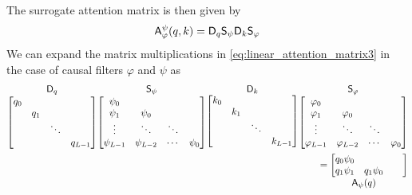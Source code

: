 %
The surrogate attention matrix is then given by
%
\begin{equation}
    \mathsf{A}_\varphi^\psi(q,k) = \mathsf{D}_q \mathsf{S}_\psi \mathsf{D}_k \mathsf{S}_\varphi
\end{equation}
%
We can expand the matrix multiplications in \eqref{eq:linear_attention_matrix3} in the case of causal filters $\varphi$ and $\psi$ as
%
\begin{equation}\label{eq:linear_attention_matrix4}
    \begin{aligned}
        \underset{ 
        \begin{bmatrix}
            q_0 &  &  &  \\
             & q_1 &  &  \\
             &  & \ddots &\\
             &  &  & q_{L-1}
        \end{bmatrix}}{\displaystyle \sD_q}
        \underset{ 
        \begin{bmatrix}
            \psi_0 & & &  \\
            \psi_1 & \psi_0 & &  \\
            \vdots & \ddots & \ddots & \\
            \psi_{L-1} & \psi_{L-2} & \cdots & \psi_0
        \end{bmatrix}}{\displaystyle \sS_\psi}
        \underset{ 
        \begin{bmatrix}
            k_0 &  &  &  \\
             & k_1 &  &  \\
             &  & \ddots &\\
             &  &  & k_{L-1}
        \end{bmatrix}}{\displaystyle \sD_k}
        \underset{
        \begin{bmatrix}
            \varphi_0 & & &  \\
            \varphi_1 & \varphi_0 & &  \\
            \vdots & \ddots & \ddots & \\
            \varphi_{L-1} & \varphi_{L-2} & \cdots & \varphi_0
        \end{bmatrix}}{\displaystyle \sS_\varphi} 
        &\\
        \underset{\displaystyle \sA_\psi(q)}{ 
        = \begin{bmatrix}
            q_0 \psi_0 &  &  &  \\
            q_1 \psi_1 & q_1 \psi_0 &  &  \\

\end{bmatrix}}
\end{aligned}
\end{equation}
